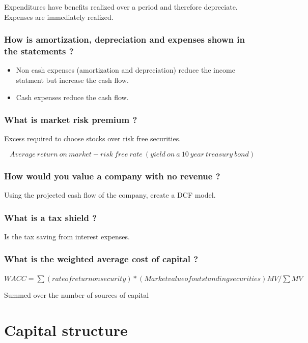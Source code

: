 \documentclass[11pt]{scrartcl} %
\begin{document}
Expenditures have benefits realized over a period and therefore depreciate. Expenses are immediately realized.

\subsubsection{How is amortization, depreciation and expenses shown in the statements ?}

\begin{itemize}
	\item Non cash expenses (amortization and depreciation) reduce the income statment but increase the cash flow.
	\item Cash expenses reduce the cash flow.
\end{itemize}

\subsubsection{What is market risk premium ?}

Excess required to choose stocks over risk free securities.

\[ Average\:return\:on\:market - risk\:free\:rate\:(yield\:on\:a\:10\:year\:treasury\:bond) \]

\subsubsection{How would you value a company with no revenue ?}

Using the projected cash flow of the company, create a DCF model. 

\subsubsection{What is a tax shield ?}

Is the tax saving from interest expenses.

\subsubsection{What is the weighted average cost of capital ?}

$WACC = \sum (rate of return on security) * (Market value of outstanding securities) MV/ \sum{MV}$

Summed over the number of sources of capital

\section{Capital structure}
\end{document}
